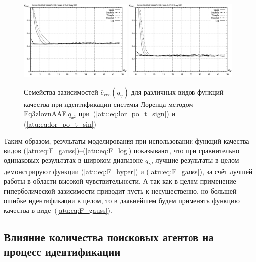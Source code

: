 \begin{figure}[ht!]
  \centerline{
    \includegraphics[width=0.49\textwidth]{p/cha/lor/Fq3zlovnAAF/f_type/lor_Fq3zlovnAAF_qx2_Ft-p_qg_e_all_sign_ree.png}
    \hfill
    \includegraphics[width=0.49\textwidth]{p/cha/lor/Fq3zlovnAAF/f_type/lor_Fq3zlovnAAF_qx2_Ft-p_qg_e_all_sin_ree.png}
  }
  \caption{Семейства зависимостей $\overline{e}_{ree}(q_\gamma)$ для различных видов функций качества при идентификации системы Лоренца методом Fq3zlovnAAF.$q_{x^2}$
   при~(\ref{atu:eq:lor_po_t_sign}) и (\ref{atu:eq:lor_po_t_sin})}
  \label{atu:f:lor_ftype_ree}
\end{figure}

Таким образом, результаты моделирования при использовании
функций качества видов
(\ref{atu:eq:F_gauss})--(\ref{atu:eq:F_log}) показывают,
что при сравнительно одинаковых результатах в широком
диапазоне $q_\gamma$, лучшие результаты в целом
демонстрируют функции (\ref{atu:eq:F_hyper}) и (\ref{atu:eq:F_gauss}),
за счёт лучшей работы в области высокой чувствительности.
А так как в целом применение гиперболической зависимости
приводит пусть к несущественно, но большей ошибке идентификации в целом,
то в дальнейшем будем применять функцию качества в виде~(\ref{atu:eq:F_gauss}).




\subsection{Влияние количества поисковых агентов на процесс идентификации}  %


